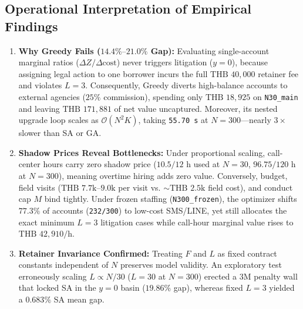 \documentclass[10pt,a4paper]{article}
\begin{document}
\subsection{Operational Interpretation of Empirical Findings}
\begin{enumerate}
    \item \textbf{Why Greedy Fails ($14.4\%\text{--}21.0\%$ Gap):} Evaluating single-account marginal ratios ($\Delta Z / \Delta \text{cost}$) never triggers litigation ($y=0$), because assigning legal action to one borrower incurs the full $\text{THB~}40{,}000$ retainer fee and violates $L=3$. Consequently, Greedy diverts high-balance accounts to external agencies ($25\%$ commission), spending only $\text{THB~}18{,}925$ on \texttt{N30\_main} and leaving $\text{THB~}171{,}881$ of net value uncaptured. Moreover, its nested upgrade loop scales as $\mathcal{O}(N^2 K)$, taking \texttt{55.70 s} at $N=300$---nearly $3\times$ slower than SA or GA.
    \item \textbf{Shadow Prices Reveal Bottlenecks:} Under proportional scaling, call-center hours carry zero shadow price ($10.5/12\text{ h}$ used at $N=30$, $96.75/120\text{ h}$ at $N=300$), meaning overtime hiring adds zero value. Conversely, budget, field visits ($\text{THB~}7.7\text{k--}9.0\text{k}$ per visit vs. $\sim \text{THB~}2.5\text{k}$ field cost), and conduct cap $M$ bind tightly. Under frozen staffing (\texttt{N300\_frozen}), the optimizer shifts $77.3\%$ of accounts (\texttt{232/300}) to low-cost SMS/LINE, yet still allocates the exact minimum $L=3$ litigation cases while call-hour marginal value rises to $\text{THB~}42{,}910/\text{h}$.
    \item \textbf{Retainer Invariance Confirmed:} Treating $F$ and $L$ as fixed contract constants independent of $N$ preserves model validity. An exploratory test erroneously scaling $L \propto N/30$ ($L=30$ at $N=300$) erected a $3\text{M}$ penalty wall that locked SA in the $y=0$ basin ($19.86\%$ gap), whereas fixed $L=3$ yielded a $0.683\%$ SA mean gap.
\end{enumerate}
\end{document}
